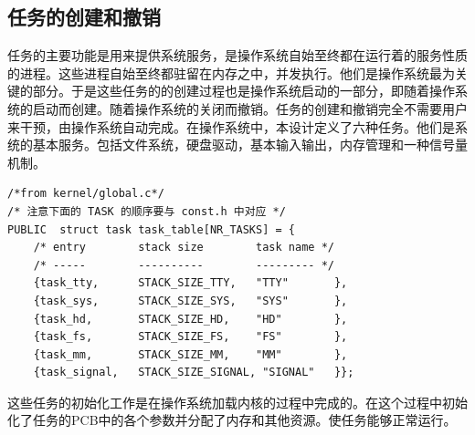 \documentclass[UTF8,nofonts,cs4size]{ctexrep}
\begin{document}
\subsection{任务的创建和撤销}
任务的主要功能是用来提供系统服务，是操作系统自始至终都在运行着的服务性质的进程。这些进程自始至终都驻留在内存之中，并发执行。他们是操作系统最为关键的部分。于是这些任务的的创建过程也是操作系统启动的一部分，即随着操作系统的启动而创建。随着操作系统的关闭而撤销。任务的创建和撤销完全不需要用户来干预，由操作系统自动完成。在操作系统中，本设计定义了六种任务。他们是系统的基本服务。包括文件系统，硬盘驱动，基本输入输出，内存管理和一种信号量机制。
\begin{lstlisting}
/*from kernel/global.c*/
/* 注意下面的 TASK 的顺序要与 const.h 中对应 */
PUBLIC	struct task	task_table[NR_TASKS] = {
	/* entry        stack size        task name */
	/* -----        ----------        --------- */
	{task_tty,      STACK_SIZE_TTY,   "TTY"       },
	{task_sys,      STACK_SIZE_SYS,   "SYS"       },
	{task_hd,       STACK_SIZE_HD,    "HD"        },
	{task_fs,       STACK_SIZE_FS,    "FS"        },
	{task_mm,       STACK_SIZE_MM,    "MM"        },
    {task_signal,	STACK_SIZE_SIGNAL, "SIGNAL"   }};
\end{lstlisting}
这些任务的初始化工作是在操作系统加载内核的过程中完成的。在这个过程中初始化了任务的PCB中的各个参数并分配了内存和其他资源。使任务能够正常运行。
\begin{lstlisting}
\end{lstlisting}
\end{document}
